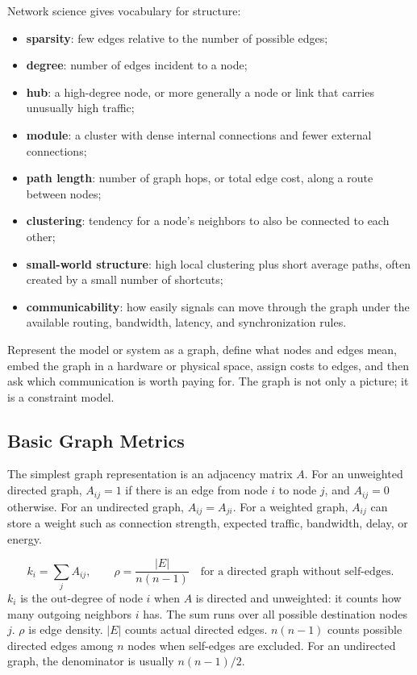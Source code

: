 Network science gives vocabulary for structure:

\begin{itemize}[leftmargin=*]
  \item \textbf{sparsity}: few edges relative to the number of possible edges;
  \item \textbf{degree}: number of edges incident to a node;
  \item \textbf{hub}: a high-degree node, or more generally a node or link that carries unusually high traffic;
  \item \textbf{module}: a cluster with dense internal connections and fewer external connections;
  \item \textbf{path length}: number of graph hops, or total edge cost, along a route between nodes;
  \item \textbf{clustering}: tendency for a node's neighbors to also be connected to each other;
  \item \textbf{small-world structure}: high local clustering plus short average paths, often created by a small number of shortcuts;
  \item \textbf{communicability}: how easily signals can move through the graph under the available routing, bandwidth, latency, and synchronization rules.
\end{itemize}

\begin{aside}
Represent the model or system as a graph, define what nodes and edges mean, embed the graph in a hardware or physical space, assign costs to edges, and then ask which communication is worth paying for. The graph is not only a picture; it is a constraint model.
\end{aside}

\subsection{Basic Graph Metrics}

The simplest graph representation is an adjacency matrix \(A\). For an unweighted directed graph, \(A_{ij}=1\) if there is an edge from node \(i\) to node \(j\), and \(A_{ij}=0\) otherwise. For an undirected graph, \(A_{ij}=A_{ji}\). For a weighted graph, \(A_{ij}\) can store a weight such as connection strength, expected traffic, bandwidth, delay, or energy.

\begin{keyequation}
\[
  k_i = \sum_j A_{ij},
  \qquad
  \rho = \frac{|E|}{n(n-1)}
  \quad \text{for a directed graph without self-edges.}
\]
\tcblower
\(k_i\) is the out-degree of node \(i\) when \(A\) is directed and unweighted: it counts how many outgoing neighbors \(i\) has. The sum runs over all possible destination nodes \(j\). \(\rho\) is edge density. \(|E|\) counts actual directed edges. \(n(n-1)\) counts possible directed edges among \(n\) nodes when self-edges are excluded. For an undirected graph, the denominator is usually \(n(n-1)/2\).
\end{keyequation}

